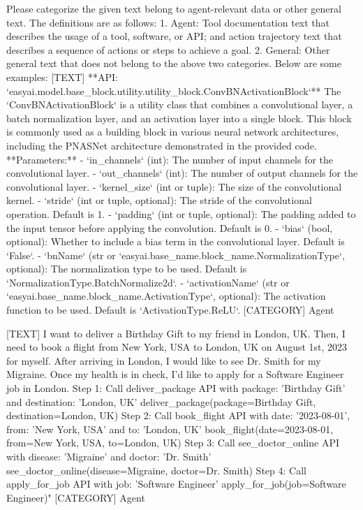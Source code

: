 Please categorize the given text belong to agent-relevant data or other general text. The 
    definitions are as follows:
1. Agent: Tool documentation text that describes the usage of a tool, software, or API; and action 
    trajectory text that describes a sequence of actions or steps to achieve a goal.
2. General: Other general text that does not belong to the above two categories.
Below are some examples:
[TEXT]
**API: `easyai.model.base_block.utility.utility_block.ConvBNActivationBlock`**  
The `ConvBNActivationBlock` is a utility class that combines a convolutional layer, a batch 
normalization layer, and an activation layer into a single block. This block is commonly used as a 
building block in various neural network architectures, including the PNASNet architecture 
demonstrated in the provided code.  **Parameters:**  - `in_channels` (int): The number of input 
channels for the convolutional layer. 
- `out_channels` (int): The number of output channels for the convolutional layer. 
- `kernel_size` (int or tuple): The size of the convolutional kernel. 
- `stride` (int or tuple, optional): The stride of the convolutional operation. Default is 1. 
- `padding` (int or tuple, optional): The padding added to the input tensor before applying the 
    convolution. Default is 0.
- `bias` (bool, optional): Whether to include a bias term in the convolutional layer. Default is 
    `False`. 
- `bnName` (str or `easyai.base_name.block_name.NormalizationType`, optional): The normalization 
    type to be used. Default is `NormalizationType.BatchNormalize2d`. 
- `activationName` (str or `easyai.base_name.block_name.ActivationType`, optional): The activation 
    function to be used. Default is `ActivationType.ReLU`.
[CATEGORY]
Agent

[TEXT]
I want to deliver a Birthday Gift to my friend in London, UK. Then, I need to book a flight from 
New York, USA to London, UK on August 1st, 2023 for myself. After arriving in London, I would like 
to see Dr. Smith for my Migraine. Once my health is in check, I'd like to apply for a Software 
Engineer job in London. 
Step 1: Call deliver_package API with package: 'Birthday Gift' and destination: 'London, UK' 
deliver_package(package=Birthday Gift, destination=London, UK) 
Step 2: Call book_flight API with date: '2023-08-01', from: 'New York, USA' and to: 'London, UK' 
book_flight(date=2023-08-01, from=New York, USA, to=London, UK) 
Step 3: Call see_doctor_online API with disease: 'Migraine' and doctor: 'Dr. Smith' 
see_doctor_online(disease=Migraine, doctor=Dr. Smith) 
Step 4: Call apply_for_job API with job: 'Software Engineer' apply_for_job(job=Software Engineer)"
[CATEGORY]
Agent

